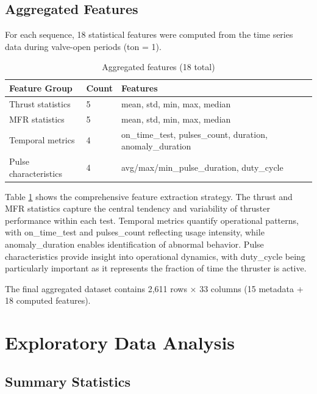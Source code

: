 \documentclass[12pt,a4paper]{article}
\begin{document}
\subsection{Aggregated Features}

For each sequence, 18 statistical features were computed from the time series data during valve-open periods (ton = 1).

\begin{table}[H]
\centering
\caption{Aggregated features (18 total)}
\label{tab:aggregated_features}
\small
\begin{tabular}{llp{6cm}}
\toprule
\textbf{Feature Group} & \textbf{Count} & \textbf{Features} \\
\midrule
Thrust statistics & 5 & mean, std, min, max, median \\
MFR statistics & 5 & mean, std, min, max, median \\
Temporal metrics & 4 & on\_time\_test, pulses\_count, duration, anomaly\_duration \\
Pulse characteristics & 4 & avg/max/min\_pulse\_duration, duty\_cycle \\
\bottomrule
\end{tabular}
\end{table}

Table \ref{tab:aggregated_features} shows the comprehensive feature extraction strategy. The thrust and MFR statistics capture the central tendency and variability of thruster performance within each test. Temporal metrics quantify operational patterns, with on\_time\_test and pulses\_count reflecting usage intensity, while anomaly\_duration enables identification of abnormal behavior. Pulse characteristics provide insight into operational dynamics, with duty\_cycle being particularly important as it represents the fraction of time the thruster is active.

The final aggregated dataset contains 2,611 rows × 33 columns (15 metadata + 18 computed features).

\section{Exploratory Data Analysis}

\subsection{Summary Statistics}
\end{document}
